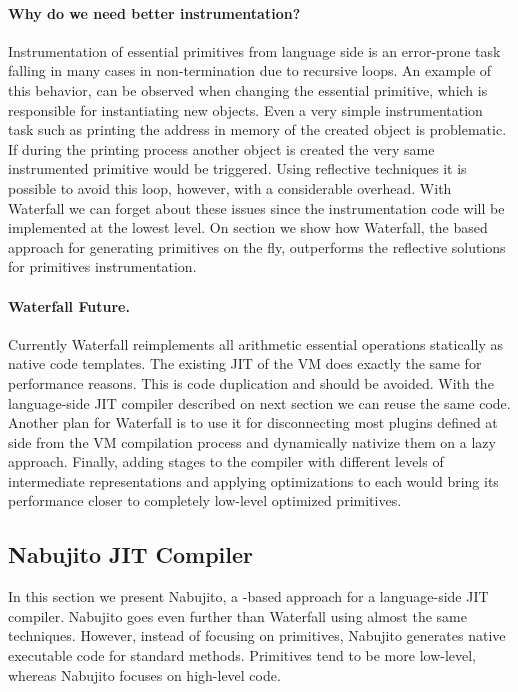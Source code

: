 \paragraph{Why do we need better instrumentation?}
Instrumentation of essential primitives from language side is an error-prone task falling in many cases in non-termination due to recursive loops. 
An example of this behavior, can be observed when changing the essential  primitive, which is responsible for instantiating new objects.
Even a very simple instrumentation task such as printing the address in memory of the created object is problematic.
If during the printing process another object is created the very same instrumented  primitive would be triggered.
Using reflective techniques it is possible to avoid this loop, however, with a considerable overhead.
With Waterfall we can forget about these issues since the instrumentation code will be implemented at the lowest level.
On section  we show how Waterfall, the \B based approach for generating primitives on the fly, outperforms the reflective solutions for primitives instrumentation. 


\paragraph{Waterfall Future.}
Currently Waterfall reimplements all \Slang arithmetic essential operations statically as native code templates.
The existing JIT of the \PH VM does exactly the same for performance reasons.
This is code duplication and should be avoided.
With the language-side JIT compiler described on next section we can reuse the same code. Another plan for Waterfall is to use it for disconnecting most plugins defined at \Slang side from the VM compilation process and dynamically nativize them on a lazy approach.
Finally, adding stages to the compiler with different levels of intermediate representations and applying optimizations to each would bring its performance closer to completely low-level optimized primitives.


\subsection{Nabujito JIT Compiler}
In this section we present Nabujito, a \B-based approach for a language-side JIT compiler.
Nabujito goes even further than Waterfall using almost the same techniques.
However, instead of focusing on primitives, Nabujito generates native executable code for standard \ST methods.
Primitives tend to be more low-level, whereas Nabujito focuses on high-level \ST code. 


